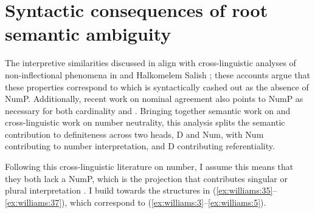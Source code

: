\documentclass[output=paper,
modfonts
]{langscibook}
\begin{document}
\section{Syntactic consequences of root semantic ambiguity}\label{sec:williams:4}

The interpretive similarities discussed in  align with cross-linguistic analyses of non-inflectional  phenomena in  \citep{Deprez2005} and Halkomelem Salish \citep{wiltschko2008}; these accounts argue that these properties correspond to  which is syntactically cashed out as the absence of NumP. Additionally, recent work on  nominal agreement \citep{Landau2016} also points to NumP as necessary for both cardinality and . Bringing together semantic work on  and cross-linguistic work on number neutrality, this analysis splits the semantic contribution to definiteness across two heads, D and Num, with Num contributing to number interpretation, and D contributing referentiality. 

Following this cross-linguistic literature on number, I assume this means that they both lack a NumP, which is the projection that contributes singular or plural interpretation \citep{ritter1991,ritter1992, ritter1995}. I build towards the structures in (\ref{ex:williams:35}--\ref{ex:williams:37}), which correspond to (\ref{ex:williams:3}--\ref{ex:williams:5}). 
\end{document}
